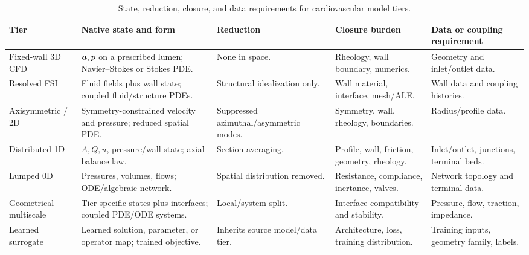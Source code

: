 \begin{table}[!htb]
    \centering
    \scriptsize
    \caption{State, reduction, closure, and data requirements for cardiovascular
    model tiers.}
    \label{tab:model-hierarchy-comparison}
    \begin{tabularx}{\textwidth}{@{}
        >{\raggedright\arraybackslash}p{}
        >{\raggedright\arraybackslash}p{}
        >{\raggedright\arraybackslash}p{}
        >{\raggedright\arraybackslash}p{}
        >{\raggedright\arraybackslash}X@{}}
        \toprule
        \textbf{Tier}
            & \textbf{Native state and form}
            & \textbf{Reduction}
            & \textbf{Closure burden}
            & \textbf{Data or coupling requirement} \\
        \midrule
        Fixed-wall 3D CFD
            & $\bm{u},p$ on a prescribed lumen; Navier--Stokes or Stokes PDE.
            & None in space.
            & Rheology, wall boundary, numerics.
            & Geometry and inlet/outlet data. \\
        Resolved FSI
            & Fluid fields plus wall state; coupled fluid/structure PDEs.
            & Structural idealization only.
            & Wall material, interface, mesh/ALE.
            & Wall data and coupling histories. \\
        Axisymmetric / 2D
            & Symmetry-constrained velocity and pressure; reduced spatial PDE.
            & Suppressed azimuthal/asymmetric modes.
            & Symmetry, wall, rheology, boundaries.
            & Radius/profile data. \\
        Distributed 1D
            & $A,Q,\bar u$, pressure/wall state; axial balance law.
            & Section averaging.
            & Profile, wall, friction, geometry, rheology.
            & Inlet/outlet, junctions, terminal beds. \\
        Lumped 0D
            & Pressures, volumes, flows; ODE/algebraic network.
            & Spatial distribution removed.
            & Resistance, compliance, inertance, valves.
            & Network topology and terminal data. \\
        Geometrical multiscale
            & Tier-specific states plus interfaces; coupled PDE/ODE systems.
            & Local/system split.
            & Interface compatibility and stability.
            & Pressure, flow, traction, impedance. \\
        Learned surrogate
            & Learned solution, parameter, or operator map; trained objective.
            & Inherits source model/data tier.
            & Architecture, loss, training distribution.
            & Training inputs, geometry family, labels. \\
        \bottomrule
    \end{tabularx}
\end{table}


